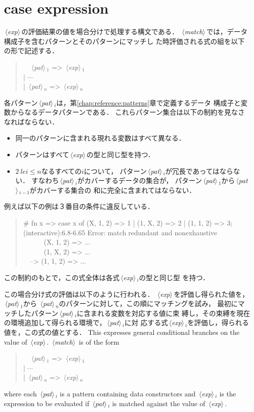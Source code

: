 \documentclass{jbook}
\newcommand{\txt}[2]{#2}
\newcommand{\nonterm}[1]{\mbox{$\,\langle$}{\it #1}\mbox{$\rangle\,$}}
\newcommand{\myem}{\mbox{\ \ }}
\newenvironment{program}{\begin{quote}\begin{tt}}%
                        {\end{tt}\end{quote}}
\begin{document}
\section{\txt{場合分け構文}{case expression}}
\label{sec:reference:case}

\ifjp%
	\nonterm{exp}の評価結果の値を場合分けで処理する構文である．
	\nonterm{match}では，データ構成子を含むパターンとそのパターンにマッチし
た時評価される式の組を以下の形で記述する．
\begin{program}
\myem  \nonterm{pat}$_1$ => \nonterm{exp}$_1$
\\
| $\cdots$
\\
| \nonterm{pat}$_n$ => \nonterm{exp}$_n$
\end{program}
	各パターン\nonterm{pat}$_i$は，第\ref{chap:reference:patterns}章で定義するデータ
構成子と変数からなるデータパターンである．
	これらパターン集合は以下の制約を見なさなればならない．
\begin{itemize}
\item 同一のパターンに含まれる現れる変数はすべて異なる．
\item パターンはすべて\nonterm{exp}の型と同じ型を持つ．
\item $2\ le i \le n$なるすべての$i$について，
パターン\nonterm{pat}$_i$が冗長であってはならない．
	すなわち\nonterm{pat}$_i$がカバーするデータの集合が，
パターン\nonterm{pat}$_1$から\nonterm{pat}$_{i-1}$がカバーする集合の
和に完全に含まれてはならない．
\end{itemize}
	例えば以下の例は３番目の条件に違反している．
\begin{program}
\# fn x => case x of (X, 1, 2) => 1 | (1, X, 2) => 2 | (1, 1, 2) => 3;
\\
(interactive):6.8-6.65 Error: match redundant and nonexhaustive
\\
\myem\myem\myem  (X, 1, 2) => ...
\\
\myem\myem\myem  (1, X, 2) => ...
\\
\myem --> (1, 1, 2) => ...
\end{program}
	この制約のもとで，この式全体は各式\nonterm{exp}$_i$の型と同じ型
を持つ．

	この場合分け式の評価は以下のように行われる．
	\nonterm{exp}を評価し得られた値を，\nonterm{pat}$_1$から
\nonterm{pat}$_n$のパターンに対して，この順にマッチングを試み，
最初にマッチしたパターン\nonterm{pat}$_i$に含まれる変数を対応する値に束
縛し，その束縛を現在の環境追加して得られる環境で，\nonterm{pat}$_i$に対
応する式\nonterm{exp}$_i$を評価し，得られる値を，この式の値とする．
\else%
	This expresses general conditional branches on the
value of \nonterm{exp}.
	\nonterm{match} is of the form
\begin{program}
\myem  \nonterm{pat}$_1$ => \nonterm{exp}$_1$
\\
| $\cdots$
\\
| \nonterm{pat}$_n$ => \nonterm{exp}$_n$
\end{program}
where each \nonterm{pat}$_i$ is a pattern containing data constructors
and \nonterm{exp}$_i$ is the expression to be evaluated if
\nonterm{pat}$_i$ is matched against the value of \nonterm{exp}.
\end{document}
